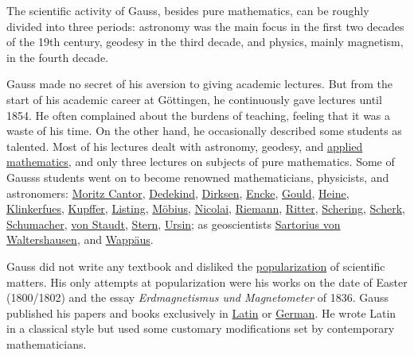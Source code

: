 The scientific activity of Gauss, besides pure mathematics, can be roughly divided into three periods: astronomy was the main focus in the first two decades of the 19th century, geodesy in the third decade, and physics, mainly magnetism, in the fourth decade.

Gauss made no secret of his aversion to giving academic lectures. But from the start of his academic career at Göttingen, he continuously gave lectures until 1854. He often complained about the burdens of teaching, feeling that it was a waste of his time. On the other hand, he occasionally described some students as talented. Most of his lectures dealt with astronomy, geodesy, and \href{https://en.wikipedia.org/wiki/Applied_mathematics}{applied mathematics}, and only three lectures on subjects of pure mathematics. Some of Gauss\textquotesingle s students went on to become renowned mathematicians, physicists, and astronomers: \href{https://en.wikipedia.org/wiki/Moritz_Cantor}{Moritz Cantor}, \href{https://en.wikipedia.org/wiki/Richard_Dedekind}{Dedekind}, \href{https://en.wikipedia.org/wiki/Enno_Dirksen}{Dirksen}, \href{https://en.wikipedia.org/wiki/Johann_Franz_Encke}{Encke}, \href{https://en.wikipedia.org/wiki/Benjamin_Apthorp_Gould}{Gould}, \href{https://en.wikipedia.org/wiki/Eduard_Heine}{Heine}, \href{https://en.wikipedia.org/wiki/Ernst_Klinkerfues}{Klinkerfues}, \href{https://en.wikipedia.org/wiki/Adolph_Theodor_Kupffer}{Kupffer}, \href{https://en.wikipedia.org/wiki/Johann_Benedict_Listing}{Listing}, \href{https://en.wikipedia.org/wiki/August_Ferdinand_Möbius}{Möbius}, \href{https://en.wikipedia.org/wiki/Friedrich_Bernhard_Gottfried_Nicolai}{Nicolai}, \href{https://en.wikipedia.org/wiki/Bernhard_Riemann}{Riemann}, \href{https://en.wikipedia.org/wiki/August_Ritter_(civil_engineer)}{Ritter}, \href{https://en.wikipedia.org/wiki/Ernst_Christian_Julius_Schering}{Schering}, \href{https://en.wikipedia.org/wiki/Heinrich_Scherk}{Scherk}, \href{https://en.wikipedia.org/wiki/Heinrich_Christian_Schumacher}{Schumacher}, \href{https://en.wikipedia.org/wiki/Karl_Georg_Christian_von_Staudt}{von Staudt}, \href{https://en.wikipedia.org/wiki/Moritz_Abraham_Stern}{Stern}, \href{https://en.wikipedia.org/wiki/Georg_Frederik_Ursin}{Ursin}; as geoscientists \href{https://en.wikipedia.org/wiki/Wolfgang_Sartorius_von_Waltershausen}{Sartorius von Waltershausen}, and \href{https://en.wikipedia.org/wiki/Johann_Eduard_Wappäus}{Wappäus}.

Gauss did not write any textbook and disliked the \href{https://en.wikipedia.org/wiki/Popular_science}{popularization} of scientific matters. His only attempts at popularization were his works on the date of Easter (1800/1802) and the essay \emph{Erdmagnetismus und Magnetometer} of 1836. Gauss published his papers and books exclusively in \href{https://en.wikipedia.org/wiki/Latin}{Latin} or \href{https://en.wikipedia.org/wiki/German_language}{German}. He wrote Latin in a classical style but used some customary modifications set by contemporary mathematicians.

